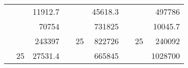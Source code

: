\begin{table}[H]
\begin{tabular}{|ccrccrccc}
\rowcolor[HTML]{DAE8FC} 
\multicolumn{1}{|c|}{\cellcolor[HTML]{FFFFC7}}                                & \multicolumn{1}{c|}{\cellcolor[HTML]{DAE8FC}}                      & \multicolumn{1}{r|}{\cellcolor[HTML]{DAE8FC}11912.7}   & \multicolumn{1}{c|}{\cellcolor[HTML]{FFFFC7}}                                & \multicolumn{1}{c|}{\cellcolor[HTML]{DAE8FC}}                       & \multicolumn{1}{r|}{\cellcolor[HTML]{DAE8FC}45618.3}   & \multicolumn{1}{c|}{\cellcolor[HTML]{FFFFC7}}                                & \multicolumn{1}{c|}{\cellcolor[HTML]{DAE8FC}}                      & \multicolumn{1}{r|}{\cellcolor[HTML]{DAE8FC}497786}    \\ \cline{3-3} \cline{6-6} \cline{9-9} 
\multicolumn{1}{|c|}{\cellcolor[HTML]{FFFFC7}}                                & \multicolumn{1}{c|}{\cellcolor[HTML]{DAE8FC}}                      & \multicolumn{1}{r|}{\cellcolor[HTML]{DDFDFF}70754}     & \multicolumn{1}{c|}{\cellcolor[HTML]{FFFFC7}}                                & \multicolumn{1}{c|}{\cellcolor[HTML]{DAE8FC}}                       & \multicolumn{1}{r|}{\cellcolor[HTML]{DDFDFF}731825}    & \multicolumn{1}{c|}{\cellcolor[HTML]{FFFFC7}}                                & \multicolumn{1}{c|}{\cellcolor[HTML]{DAE8FC}}                      & \multicolumn{1}{r|}{\cellcolor[HTML]{DDFDFF}10045.7}   \\ \cline{3-3} \cline{6-6} \cline{9-9} 
\rowcolor[HTML]{DAE8FC} 
\multicolumn{1}{|c|}{\cellcolor[HTML]{FFFFC7}}                                & \multicolumn{1}{c|}{\cellcolor[HTML]{DAE8FC}}                      & \multicolumn{1}{r|}{\cellcolor[HTML]{DAE8FC}243397}    & \multicolumn{1}{c|}{\cellcolor[HTML]{FFFFC7}}                                & \multicolumn{1}{c|}{\multirow{-9}{*}{\cellcolor[HTML]{DAE8FC}25}}   & \multicolumn{1}{r|}{\cellcolor[HTML]{DAE8FC}822726}    & \multicolumn{1}{c|}{\cellcolor[HTML]{FFFFC7}}                                & \multicolumn{1}{c|}{\multirow{-9}{*}{\cellcolor[HTML]{DAE8FC}25}}  & \multicolumn{1}{r|}{\cellcolor[HTML]{DAE8FC}240092}    \\ \cline{3-3} \cline{5-6} \cline{8-9} 
\multicolumn{1}{|c|}{\cellcolor[HTML]{FFFFC7}}                                & \multicolumn{1}{c|}{\multirow{-10}{*}{\cellcolor[HTML]{DAE8FC}25}} & \multicolumn{1}{r|}{\cellcolor[HTML]{DDFDFF}27531.4}   & \multicolumn{1}{c|}{\cellcolor[HTML]{FFFFC7}}                                & \multicolumn{1}{c|}{\cellcolor[HTML]{DDFDFF}}                       & \multicolumn{1}{r|}{\cellcolor[HTML]{DAE8FC}665845}    & \multicolumn{1}{c|}{\cellcolor[HTML]{FFFFC7}}                                & \multicolumn{1}{c|}{\cellcolor[HTML]{DDFDFF}}                      & \multicolumn{1}{r|}{\cellcolor[HTML]{DAE8FC}1028700}   \\ \cline{2-3} \cline{6-6} \cline{9-9} 

\end{tabular}
\end{table}
